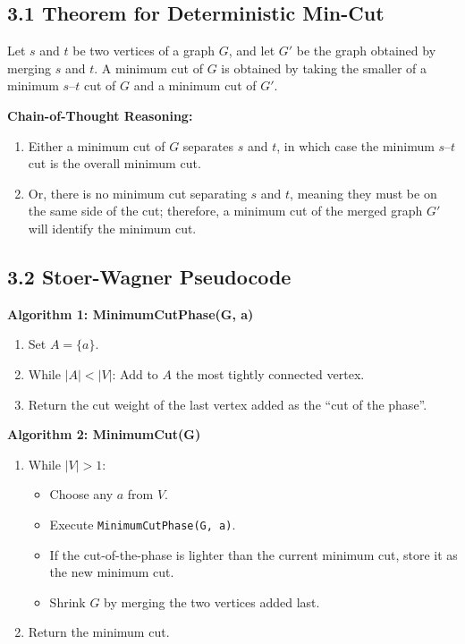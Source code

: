 \documentclass[12pt]{article}
\begin{document}
\subsection*{3.1 Theorem for Deterministic Min-Cut}

Let $s$ and $t$ be two vertices of a graph $G$, and let $G'$ be the graph obtained by merging $s$ and $t$. A minimum cut of $G$ is obtained by taking the smaller of a minimum $s$--$t$ cut of $G$ and a minimum cut of $G'$.

\textbf{Chain-of-Thought Reasoning:}

\begin{enumerate}
\item Either a minimum cut of $G$ separates $s$ and $t$, in which case the minimum $s$--$t$ cut is the overall minimum cut.

\item Or, there is no minimum cut separating $s$ and $t$, meaning they must be on the same side of the cut; therefore, a minimum cut of the merged graph $G'$ will identify the minimum cut.
\end{enumerate}

\subsection*{3.2 Stoer-Wagner Pseudocode}

\textbf{Algorithm 1: MinimumCutPhase(G, a)}

\begin{enumerate}
\item Set $A = \{a\}$.

\item While $|A| < |V|$: Add to $A$ the most tightly connected vertex.

\item Return the cut weight of the last vertex added as the ``cut of the phase''.
\end{enumerate}

\textbf{Algorithm 2: MinimumCut(G)}

\begin{enumerate}
\item While $|V| > 1$:
\begin{itemize}
\item Choose any $a$ from $V$.

\item Execute \texttt{MinimumCutPhase(G, a)}.

\item If the cut-of-the-phase is lighter than the current minimum cut, store it as the new minimum cut.

\item Shrink $G$ by merging the two vertices added last.
\end{itemize}

\item Return the minimum cut.
\end{enumerate}
\end{document}
